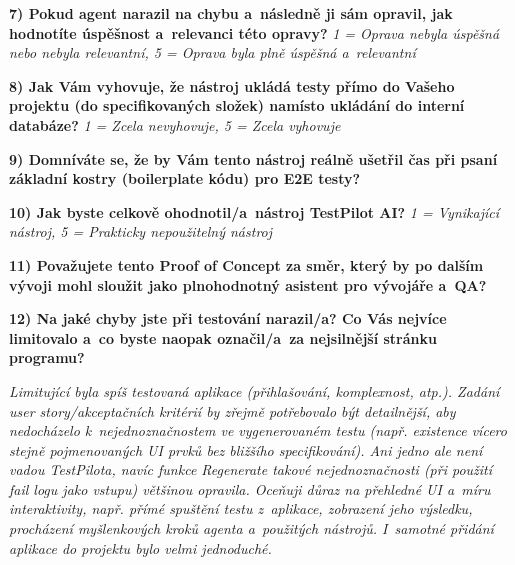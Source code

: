 \documentclass[czech, ing, kiv, he, iso690numb, viewonly]{fasthesis}
\begin{document}
\begin{tcolorbox}[breakable, colback=gray!3, colframe=black!35, boxrule=0.4pt, arc=2pt, title={Google Forms - export odpovědi}]
 \quad {} \quad {} \quad {} \quad {}

\textbf{7) Pokud agent narazil na chybu a~následně ji sám opravil, jak hodnotíte úspěšnost a~relevanci této opravy?}
\textit{1 = Oprava nebyla úspěšná nebo nebyla relevantní, 5 = Oprava byla plně úspěšná a~relevantní}

 \quad {} \quad {} \quad {} \quad {}

\textbf{8) Jak Vám vyhovuje, že nástroj ukládá testy přímo do Vašeho projektu (do specifikovaných složek) namísto ukládání do interní databáze?}
\textit{1 = Zcela nevyhovuje, 5 = Zcela vyhovuje}

 \quad {} \quad {} \quad {} \quad {}

\textbf{9) Domníváte se, že by Vám tento nástroj reálně ušetřil čas při psaní základní kostry (boilerplate kódu) pro E2E testy?}

 \quad {} \quad {} \quad {}

\textbf{10) Jak byste celkově ohodnotil/a~nástroj TestPilot AI?}
\textit{1 = Vynikající nástroj, 5 = Prakticky nepoužitelný nástroj}

 \quad {} \quad {} \quad {} \quad {}

\textbf{11) Považujete tento Proof of Concept za směr, který by po dalším vývoji mohl sloužit jako plnohodnotný asistent pro vývojáře a~QA?}

 \quad {} \quad {} \quad {}

\textbf{12) Na jaké chyby jste při testování narazil/a? Co Vás nejvíce limitovalo a~co byste naopak označil/a~za nejsilnější stránku programu?}

\textit{Limitující byla spíš testovaná aplikace (přihlašování, komplexnost, atp.). Zadání user story/akceptačních kritérií by zřejmě potřebovalo být detailnější, aby nedocházelo k~nejednoznačnostem ve vygenerovaném testu (např. existence vícero stejně pojmenovaných UI prvků bez bližšího specifikování). Ani jedno ale není vadou TestPilota, navíc funkce Regenerate takové nejednoznačnosti (při použití fail logu jako vstupu) většinou opravila. Oceňuji důraz na přehledné UI a~míru interaktivity, např. přímé spuštění testu z~aplikace, zobrazení jeho výsledku, procházení myšlenkových kroků agenta a~použitých nástrojů. I~samotné přidání aplikace do projektu bylo velmi jednoduché.}

\end{tcolorbox}
\end{document}
